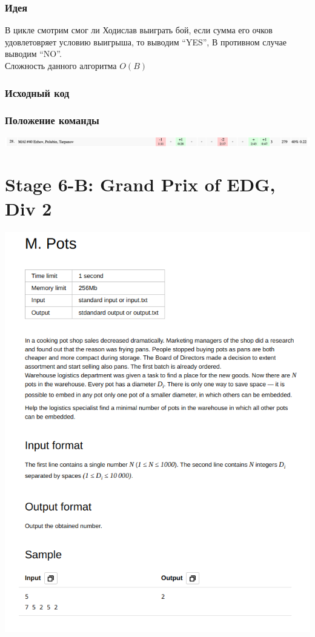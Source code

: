 \documentclass[12pt]{article}
\begin{document}
\subsubsection*{Идея}
В цикле смотрим смог ли Ходислав выиграть бой, если сумма его очков удовлетовряет условию выигрыша, то выводим “YES”, В противном случае выводим “NO”.
\\ 
Сложность данного алгоритма $O(B)$ 
\subsubsection*{Исходный код}

\subsubsection*{Положение команды}
\includegraphics[scale=0.35]{images/5.png}\newline\noindent

\pagebreak
\section{Stage 6-B: Grand Prix of EDG, Div 2}
\includegraphics[scale=0.75]{statements/6_M.png}
\end{document}
